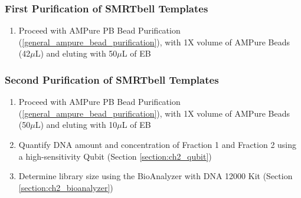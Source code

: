 \subsubsection{First Purification of SMRTbell Templates}
\begin{enumerate}
	\item Proceed with AMPure PB Bead Purification (\cref{general_ampure_bead_purification}), with 1X volume of AMPure Beads (42$\mu$L) and eluting with 50$\mu$L of EB
\end{enumerate} 

\subsubsection{Second Purification of SMRTbell Templates }
\begin{enumerate}
	\item Proceed with AMPure PB Bead Purification (\cref{general_ampure_bead_purification}), with 1X volume of AMPure Beads (50$\mu$L) and eluting with 10$\mu$L of EB
	\item Quantify DNA amount and concentration of Fraction 1 and Fraction 2 using a high-sensitivity Qubit (Section \ref{section:ch2_qubit}) 
	\item Determine library size using the BioAnalyzer with DNA 12000 Kit (Section \ref{section:ch2_bioanalyzer}) 
\end{enumerate} 